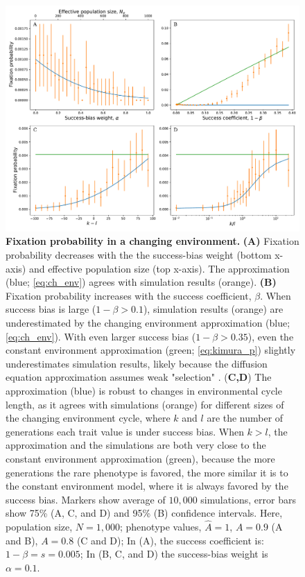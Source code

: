 \documentclass[12pt]{extarticle}
\begin{document}
\begin{figure}[H]
    \includegraphics[width=\linewidth]{../figures/final/ch_env.pdf}
  \caption{\textbf{Fixation probability in a changing environment.}
\textbf{(A)} Fixation probability decreases with the the success-bias weight (bottom x-axis) and effective population size (top x-axis). The approximation (blue; \cref{eq:ch_env}) agrees with simulation results (orange). 
\textbf{(B)} Fixation probability increases with the success coefficient, $\beta$.
When success bias is large ($1-\beta > 0.1$),  
simulation results (orange) are underestimated by the changing environment approximation (blue; \cref{eq:ch_env}). With even larger success bias ($1-\beta > 0.35$), even the constant environment approximation (green; \cref{eq:kimura_p}) slightly underestimates simulation results, likely because the diffusion equation approximation assumes weak "selection" .
(\textbf{C,D}) The approximation (blue) is robust to changes in environmental cycle length, as it agrees with simulations (orange) for different sizes of the changing environment cycle, where $k$ and $l$ are the number of generations each trait value is under success bias. 
When $k>l$, the approximation and the simulations are both very close to the constant environment approximation (green), because the more generations the rare phenotype is favored, the more similar it is to the constant environment model, where it is always favored by the success bias.
Markers show average of $10,000$ simulations, error bars show 75\% (A, C, and D) and 95\% (B) confidence intervals.
  Here, population size, $N=1,000$; phenotype values, $\hat{A}=1$, $A=0.9$ (A and B), $A=0.8$ (C and D); In (A), the success coefficient is: $1-\beta=s=0.005$; In (B, C, and D) the success-bias weight is $\alpha=0.1$.}
  \label{fig:ch_env_alpha_beta}
\end{figure}
\end{document}
